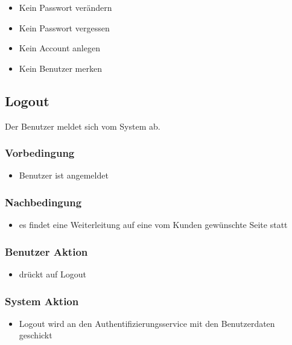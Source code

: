 \documentclass[a4paper,12pt]{article}
\begin{document}
\begin{itemize}
\item
  Kein Passwort verändern
\item
  Kein Passwort vergessen
\item
  Kein Account anlegen
\item
  Kein Benutzer merken
\end{itemize}

\subsection{Logout}\label{logout}
Der Benutzer meldet sich vom System ab.

\subsubsection{Vorbedingung}\label{vorbedingung-1}

\begin{itemize}
\item
  Benutzer ist angemeldet
\end{itemize}

\subsubsection{Nachbedingung}\label{nachbedingung-1}

\begin{itemize}
\item
  es findet eine Weiterleitung auf eine vom Kunden gewünschte Seite
  statt
\end{itemize}

\subsubsection{Benutzer Aktion}\label{benutzer-aktion-1}

\begin{itemize}
\item
  drückt auf Logout
\end{itemize}

\subsubsection{System Aktion}\label{system-aktion-1}

\begin{itemize}
\item
  Logout wird an den Authentifizierungsservice mit den Benutzerdaten
  geschickt
\end{itemize}
\end{document}
